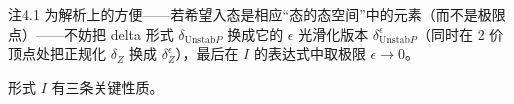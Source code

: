 
\begin{thmenv}{注}{4.1}\label{rem:4.1}
为解析上的方便——若希望入态是相应“态的态空间”中的元素（而不是极限点）——不妨把 delta 形式 $\delta_{\mathrm{Unstab}P}$ 换成它的 $\epsilon$ 光滑化版本 $\delta^{\epsilon}_{\mathrm{Unstab}P}$（同时在 2 价顶点处把正规化 $\delta_Z$ 换成 $\delta^{\epsilon}_Z$），最后在 $I$ 的表达式中取极限 $\epsilon\to0$。
\end{thmenv}


形式 $I$ 有三条关键性质。

